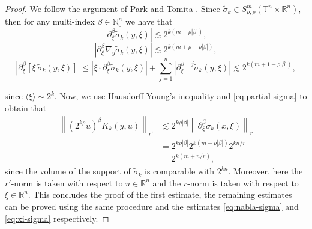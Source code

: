 \documentclass[12pt, reqno]{amsart}
\theoremstyle{definition}
\theoremstyle{remark}
\numberwithin{equation}{section}
\begin{document}
\begin{proof}
    We follow the argument of Park and Tomita \cite{park-tomita}. Since $\tilde{\sigma}_k \in S^m_{\rho,\rho}(\mathbb{T}^n \times \mathbb{R}^n) $, then for any multi-index $\beta\in \mathbb{N}_0^n$ we have that
    \begin{equation}
        \left|\partial_\xi^\beta \tilde{\sigma}_k(y, \xi)\right| \lesssim 2^{k(m-\rho|\beta|)},
        \label{eq:partial-sigma}
    \end{equation}
    \begin{equation}
        \left|\partial_\xi^\beta \nabla_y \tilde{\sigma}_k(y, \xi)\right| \lesssim 2^{k(m+\rho-\rho|\beta|)},
        \label{eq:nabla-sigma}
    \end{equation}
    \begin{equation}
        \left|\partial_\xi^\beta [\xi \  \tilde{\sigma}_k(y, \xi)]\right| \leq 
        \left|\xi\cdot\partial_\xi^\beta \tilde{\sigma}_k(y,\xi)\right| + \sum_{j=1}^n \left| \partial_\xi^{\beta-j} \tilde{\sigma}_k(y,\xi) \right|
        \lesssim
         2^{k(m+1-\rho|\beta|)},
        \label{eq:xi-sigma}
    \end{equation}
        
    since $\langle\xi\rangle \sim 2^k$. Now, we use Hausdorff-Young's inequality and \cref{eq:partial-sigma} to obtain that
    \begin{align*}
        \left\| (2^{k\rho}u)^\beta K_k(y, u)
        \right\|_{r'} & \lesssim2^{k\rho|\beta|} \left\| 
        \partial_\xi^\beta \tilde{\sigma}_k(x, \xi)
        \right\|_{r} \\
        & = 2^{k\rho|\beta|} 2^{k(m-\rho|\beta|)} 2^{kn/r} \\
        & =  2^{k(m+n/r)},
    \end{align*}
    since the volume of the support of $\tilde{\sigma}_k$ is comparable with $2^{kn}$. Moreover, here the $r'$-norm is taken with respect to $u \in \mathbb{R}^n$ and the $r$-norm is taken with respect to $\xi\in\mathbb{R}^n$. This concludes the proof of the first estimate, the remaining estimates can be proved using the same procedure and the estimates \cref{eq:nabla-sigma} and \cref{eq:xi-sigma} respectively.
\end{proof}
\end{document}
